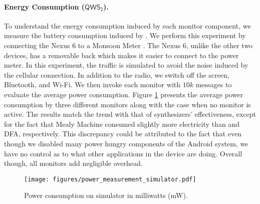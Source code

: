 \paragraph{Energy Consumption ($\mathsf{QWS_2}$).}
To understand the energy consumption induced by each monitor component, we
measure the battery consumption induced by \system. We perform this
experiment by connecting
the Nexus 6 to a Monsoon Meter \cite{monsoon}. The Nexus 6, unlike the other
two devices, has a removable back which makes it easier to connect to the power
meter. In this experiment, the traffic is simulated to avoid the noise induced
by the cellular connection. In addition to the radio, we switch off the screen,
Bluetooth, and Wi-Fi. We then invoke each monitor with $10k$
messages to evaluate the average power consumption. Figure \ref{fig:power_consumption_simulator}
presents the average power consumption by three different monitors along with the case when no monitor is active.
The results match the trend with that of synthesizers' effectiveness,
except for the fact that Mealy Machine consumed slightly  more electricity than
\pltl and DFA, respectively. %
This discrepancy could be attributed to
the fact that even though we disabled many power hungry components of the Android system, we
have no control as to what other applications in the device are doing. Overall
though, all monitors add negligible overhead.


\begin{figure}[t]
  \centering
	\texttt{[image: figures/power\_measurement\_simulator.pdf]}
	\caption{Power consumption on simulator in milliwatts (mW).}
	\label{fig:power_consumption_simulator}
\end{figure}



